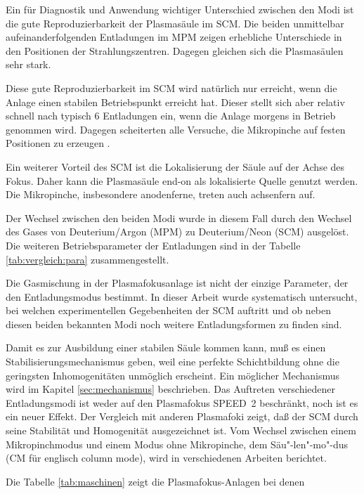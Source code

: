 %
\par
Ein für Diagnostik und Anwendung wichtiger Unterschied zwischen den
Modi ist die gute Reproduzierbarkeit der Plasmasäule im SCM. Die beiden
unmittelbar aufeinanderfolgenden Entladungen im MPM zeigen erhebliche
Unterschiede in den Positionen der Strahlungszentren. Dagegen gleichen
sich die Plasmasäulen sehr stark.
\par
Diese gute Reproduzierbarkeit im SCM wird natürlich nur erreicht, wenn
die Anlage einen stabilen Betriebspunkt erreicht hat. Dieser stellt
sich aber relativ schnell nach typisch 6 Entladungen ein, wenn die
Anlage morgens in Betrieb genommen wird. Dagegen scheiterten alle
Versuche, die Mikropinche auf festen Positionen zu erzeugen
\cite{lucas:diplom}.
\par
Ein weiterer Vorteil des SCM ist die Lokalisierung der Säule auf der
Achse des Fokus. Daher kann die Plasmasäule end-on als lokalisierte
Quelle genutzt werden. Die Mikropinche, insbesondere anodenferne,
treten auch achsenfern auf.
\par
Der Wechsel zwischen den beiden Modi wurde in diesem Fall durch den
Wechsel des Gases von Deuterium/Argon (MPM) zu Deuterium/Neon (SCM)
ausgelöst. Die weiteren Betriebsparameter der Entladungen sind in der
Tabelle \vref{tab:vergleich:para} zusammengestellt.
\par
Die Gasmischung in der Plasmafokusanlage ist nicht der einzige
Parameter, der den Entladungsmodus bestimmt. In dieser Arbeit wurde
systematisch untersucht, bei welchen experimentellen Gegebenheiten der
SCM auftritt und ob neben diesen beiden bekannten Modi noch weitere
Entladungsformen zu finden sind.
\par
Damit es zur Ausbildung einer stabilen Säule kommen kann, muß es einen
Stabilisierungsmechanismus geben, weil eine perfekte Schichtbildung
ohne die geringsten Inhomogenitäten unmöglich erscheint. Ein möglicher
Mechanismus wird im Kapitel \vref{sec:mechanismus} beschrieben.
%
\label{sec:vergleich}
%
Das Auftreten verschiedener Entladungsmodi ist weder auf den
Plasmafokus SPEED~2 beschränkt, noch ist es ein neuer Effekt. Der
Vergleich mit anderen Plasmafoki zeigt, daß der SCM durch seine
Stabilität und Homogenität ausgezeichnet ist. Vom Wechsel zwischen
einem Mikropinchmodus und einem Modus ohne Mikropinche, dem
Säu"-len"-mo"-dus (CM für englisch column mode), wird in
verschiedenen Arbeiten berichtet.
\par
Die Tabelle \vref{tab:maschinen} zeigt die Plasmafokus-Anlagen bei denen
